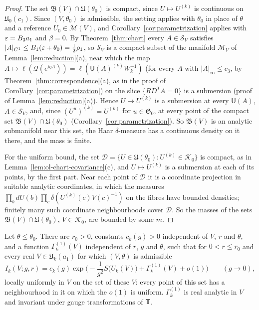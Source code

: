 \begin{proof}
The set $\mathfrak B(V)\cap\mathfrak U(\theta_0)$ is compact, since $U\mapsto U^{(k)}$ is continuous on $\mathfrak U_0(c_1)$. Since $(V,\theta_0)$ is admissible, the setting applies with $\theta_0$ in place of $\theta$ and a reference $U_0\in\mathscr M(V)$, and Corollary~\ref{cor:parametrization} applies with $\varepsilon=B_3a_1$ and $\beta=0$. By Theorem~\ref{thm:chart} every $A\in\mathcal S_V$ satisfies $|A|_{C^1}\le B_1(\varepsilon+\theta_0)=\frac12\rho_1$, so $\mathcal S_V$ is a compact subset of the manifold $\mathcal M_V$ of Lemma~\ref{lem:reduction}(a), near which the map $A\mapsto\ell(\mathcal Q(e^{\ii\eta A}))=\ell(\mathsf U(A)^{(k)}W_k^{-1})$ (for every $A$ with $|A|_\infty\le c_3$, by Theorem~\ref{thm:correspondence}(a), as in the proof of Corollary~\ref{cor:parametrization}) on the slice $\{RD^TA=0\}$ is a submersion (proof of Lemma~\ref{lem:reduction}(a)). Hence $U\mapsto U^{(k)}$ is a submersion at every $\mathsf U(A)$, $A\in\mathcal S_V$, and, since $(U^u)^{(k)}=U^{(k)}$ for $u\in\mathfrak G_0$, at every point of the compact set $\mathfrak B(V)\cap\mathfrak U(\theta_0)$ (Corollary~\ref{cor:parametrization}). So $\mathfrak B(V)$ is an analytic submanifold near this set, the Haar $\delta$-measure has a continuous density on it there, and the mass is finite.

For the uniform bound, the set $\mathcal D=\{U\in\mathfrak U(\theta_0):U^{(k)}\in\mathcal K_0\}$ is compact, as in Lemma~\ref{lem:ol-chart-covariance}(c), and $U\mapsto U^{(k)}$ is a submersion at each of its points, by the first part. Near each point of $\mathcal D$ it is a coordinate projection in suitable analytic coordinates, in which the measures $\prod_bdU(b)\prod_c\delta(U^{(k)}(c)V(c)^{-1})$ on the fibres have bounded densities; finitely many such coordinate neighbourhoods cover $\mathcal D$. So the masses of the sets $\mathfrak B(V)\cap\mathfrak U(\theta_0)$, $V\in\mathcal K_0$, are bounded by some $m$.
\end{proof}

\begin{proposition}\label{prop:ol-laplace}
Let $\theta\le\theta_0$. There are $r_0>0$, constants $c_k(g)>0$ independent of $V$, $r$ and $\theta$, and a function $\Gamma^{(1)}_k(V)$ independent of $r$, $g$ and $\theta$, such that for $0<r\le r_0$ and every real $V\in\mathfrak U_k(a_1)$ for which $(V,\theta)$ is admissible
\[
I_k(V;g,r)=c_k(g)\exp\Big(-\frac1{g^2}S\big(U_k(V)\big)+\Gamma^{(1)}_k(V)+o(1)\Big)\qquad(g\to0),
\]
locally uniformly in $V$ on the set of these $V$: every point of this set has a neighbourhood in it on which the $o(1)$ is uniform. $\Gamma^{(1)}_k$ is real analytic in $V$ and invariant under gauge transformations of $\mathbb T$.
\end{proposition}

